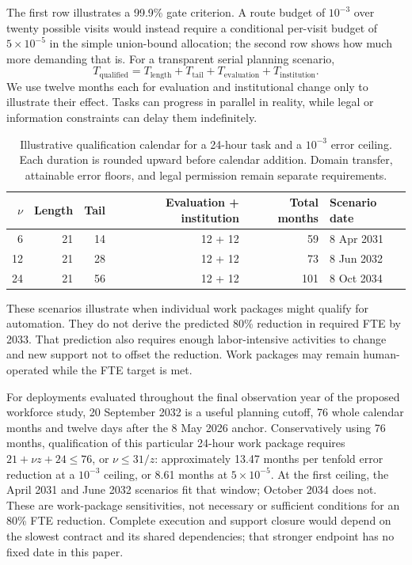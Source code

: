 The first row illustrates a 99.9\% gate criterion. A route budget of $10^{-3}$ over twenty possible
visits would instead require a conditional per-visit budget of $5\times10^{-5}$ in the simple
union-bound allocation; the second row shows how much more demanding that is. For a transparent serial
planning scenario,
\begin{equation}
T_{\mathrm{qualified}}=T_{\mathrm{length}}+T_{\mathrm{tail}}+T_{\mathrm{evaluation}}+T_{\mathrm{institution}}.
\label{eq:qualified}
\end{equation}
We use twelve months each for evaluation and institutional change only to illustrate their effect.
Tasks can progress in parallel in reality, while legal or information constraints can delay them
indefinitely.

\begin{table}[!htb]
\centering\small
\caption{Illustrative qualification calendar for a 24-hour task and a $10^{-3}$ error ceiling. Each
duration is rounded upward before calendar addition. Domain transfer, attainable error floors, and
legal permission remain separate requirements.}
\label{tab:calendar}
\begin{tabular}{@{}r r r r r l@{}}
\toprule
$\nu$ & Length & Tail & Evaluation + institution & Total months & Scenario date\\
\midrule
6 & 21 & 14 & 12 + 12 & 59 & 8 Apr 2031\\
12 & 21 & 28 & 12 + 12 & 73 & 8 Jun 2032\\
24 & 21 & 56 & 12 + 12 & 101 & 8 Oct 2034\\
\bottomrule
\end{tabular}
\end{table}

These scenarios illustrate when individual work packages might qualify for automation. They do
not derive the predicted 80\% reduction in required FTE by 2033. That prediction also requires enough
labor-intensive activities to change and new support not to offset
the reduction. Work packages may remain human-operated while the FTE target is met.

For deployments evaluated throughout the final observation year of the proposed workforce study,
20 September 2032 is a useful planning cutoff, 76 whole calendar months and twelve days after the
8 May 2026 anchor. Conservatively using 76 months, qualification of this particular 24-hour work
package requires $21+\nu z+24\le 76$, or $\nu\le 31/z$: approximately 13.47 months per tenfold
error reduction at a $10^{-3}$ ceiling, or 8.61 months at $5\times10^{-5}$.
At the first ceiling, the April 2031 and June 2032 scenarios fit that window; October 2034 does not.
These are work-package sensitivities, not necessary or sufficient conditions for an 80\% FTE
reduction. Complete execution and support closure would depend on the slowest contract and its
shared dependencies; that stronger endpoint has no fixed date in this paper.

